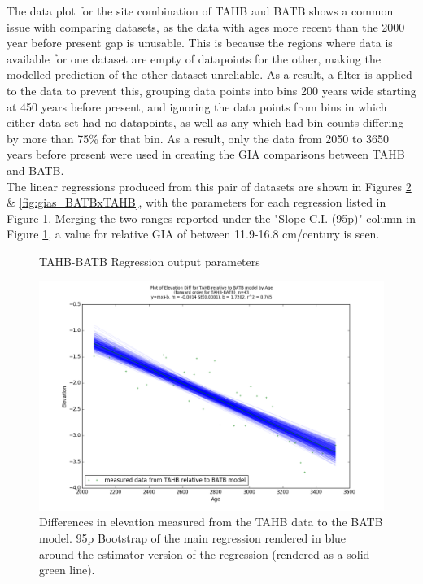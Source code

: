 The data plot for the site combination of TAHB and BATB shows a common issue
with comparing datasets, as the data with ages more recent than the 2000 year before
present gap is unusable. This is because the regions where data is available for
one dataset are empty of datapoints for the other, making the modelled prediction
of the other dataset unreliable. As a result, a filter is applied to the
data to prevent this, grouping data points into bins 200 years wide starting at 450 years before present, and
ignoring the data points from bins in which either data set had no datapoints,
as well as any which had bin counts differing by more than 75\% for that bin.
As a result, only the data from 2050 to 3650 years before present were used in
creating the GIA comparisons between TAHB and BATB.\\
The linear regressions produced from this pair of datasets are shown in Figures 
\ref{fig:gias_TAHBxBATB} \& \ref{fig:gias_BATBxTAHB}, with the parameters for each
regression listed in Figure \ref{fig:TAHBxBATB_regression}. Merging the two ranges
reported under the "Slope C.I. (95p)" column in Figure \ref{fig:TAHBxBATB_regression},
a value for relative GIA of between 11.9-16.8 cm/century is seen. \\


\begin{figure}[H]
	\begin{flushleft}
	\end{flushleft}
	\caption{TAHB-BATB Regression output parameters}
	\label{fig:TAHBxBATB_regression}
\end{figure}


\newpage

\begin{figure}[H]
	\includegraphics[width=1.7\linewidth, angle=270 ]{data/bothNonZero/withinSeventyFivePercent/gias/theGIA_TAHB_relative_to_BATB.png}
	\caption{Differences in elevation measured from the TAHB data to the BATB model. 95p Bootstrap of the main regression rendered in blue around the estimator version of the regression (rendered as a solid green line).}
	\label{fig:gias_TAHBxBATB}
\end{figure}
\newpage


